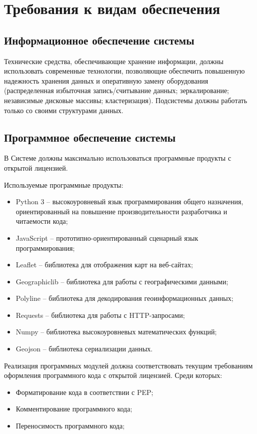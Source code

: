 \section{Требования к видам обеспечения}
\subsection{Информационное обеспечение системы}
Технические средства, обеспечивающие хранение информации, должны использовать современные 
технологии, позволяющие обеспечить повышенную надежность хранения данных и оперативную замену 
оборудования (распределенная избыточная запись/считывание данных; зеркалирование; независимые 
дисковые массивы; кластеризация). Подсистемы должны работать только со своими структурами данных.

\subsection{Программное обеспечение системы}
\label{sec:software}
В Системе должны максимально использоваться программные продукты с открытой лицензией. 

Используемые программные продукты:
\begin{itemize}
    \item Python 3 -- высокоуровневый язык программирования общего назначения, ориентированный на повышение 
        производительности разработчика и читаемости кода;
    \item JavaScript -- прототипно-ориентированный сценарный язык программирования;
    \item Leaflet -- библиотека для отображения карт на веб-сайтах;
    \item Geographiclib -- библиотека для работы с географическими данными;
    \item Polyline -- библиотека для декодирования геоинформационных данных;
    \item Requests -- библиотека для работы с HTTP-запросами;
    \item Numpy -- библиотека высокоуровневых математических функций;
    \item Geojson -- библиотека сериализации данных.
\end{itemize}

Реализация программных модулей должна соответствовать текущим требованиям оформления программного кода 
с открытой лицензией. Среди которых:
\begin{itemize}
    \item Форматирование кода в соответствии с PEP;
    \item Комментирование программного кода;
    \item Переносимость программного кода;
\end{itemize}

